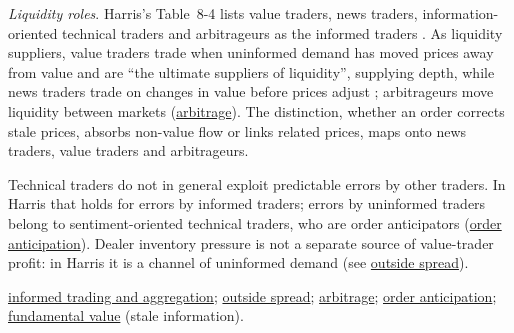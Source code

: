 \begin{qfdefinition}
\emph{Liquidity roles}. Harris's Table~8-4 lists value traders, news traders, information-oriented technical traders and arbitrageurs as the informed traders \citep[chap.~``Why People Trade'', sec.~8.2.1, pp.~194--196]{alpha-harris}. As liquidity suppliers, value traders trade when uninformed demand has moved prices away from value and are ``the ultimate suppliers of liquidity'', supplying depth, while news traders trade on changes in value before prices adjust \citep[chap.~``Liquidity'', sec.~19.3.4, pp.~402--403]{alpha-harris}; arbitrageurs move liquidity between markets (\hyperref[def:arbitrage]{arbitrage}). The distinction, whether an order corrects stale prices, absorbs non-value flow or links related prices, maps onto news traders, value traders and arbitrageurs.

 Technical traders do not in general exploit predictable errors by other traders. In Harris that holds for errors by informed traders; errors by uninformed traders belong to sentiment-oriented technical traders, who are order anticipators (\hyperref[def:order-anticipation]{order anticipation}). Dealer inventory pressure is not a separate source of value-trader profit: in Harris it is a channel of uninformed demand (see \hyperref[def:outside-spread]{outside spread}).

 \hyperref[res:informed-trading-aggregation]{informed trading and aggregation}; \hyperref[def:outside-spread]{outside spread}; \hyperref[def:arbitrage]{arbitrage}; \hyperref[def:order-anticipation]{order anticipation}; \hyperref[def:fundamental-value]{fundamental value} (stale information).

\end{qfdefinition}

